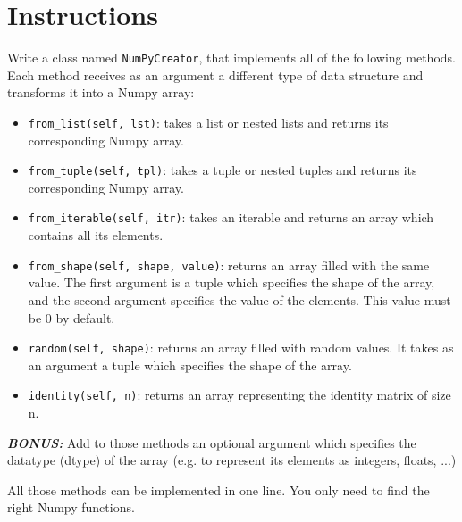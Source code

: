 \documentclass{42-en}
\begin{document}
\section*{Instructions}
Write a class named \texttt{NumPyCreator}, that implements all of the following methods.
Each method receives as an argument a different type of data structure and transforms it into a Numpy array:
\begin{itemize}
  \item \texttt{from\_list(self, lst)}: takes a list or nested lists and returns its corresponding Numpy array.
  \item \texttt{from\_tuple(self, tpl)}: takes a tuple or nested tuples and returns its corresponding Numpy array.
  \item \texttt{from\_iterable(self, itr)}: takes an iterable and returns an array which contains all its elements.
  \item \texttt{from\_shape(self, shape, value)}: returns an array filled with the same value.
  The first argument is a tuple which specifies the shape of the array, and the second argument specifies the value of the elements. 
  This value must be 0 by default.
  \item \texttt{random(self, shape)}: returns an array filled with random values.
  It takes as an argument a tuple which specifies the shape of the array.
  \item \texttt{identity(self, n)}: returns an array representing the identity matrix of size n.
\end{itemize}


\textit{\textbf{BONUS:}} Add to those methods an optional argument which specifies the datatype (dtype) of the array (e.g. to represent its elements as integers, floats, ...)

\hint All those methods can be implemented in one line. You only need to find the right Numpy functions.

\end{document}
